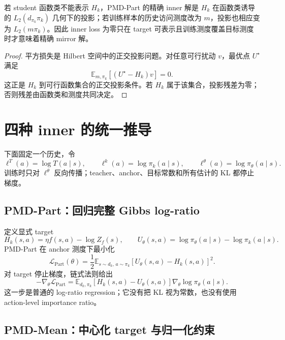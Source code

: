 \begin{proposition}[平方回归的投影含义]
\label{prop:ch2-regression-projection}
若 student 函数类不能表示 $H_k$，PMD-Part 的精确 inner 解是 $H_k$ 在函数类诱导的 $L_2(d_{\pi_k}\pi_k)$ 几何下的投影；若训练样本的历史访问测度改为 $m$，投影也相应变为 $L_2(m\pi_k)$。因此 inner loss 为零只在 target 可表示且训练测度覆盖目标测度时才意味着精确 mirror 解。
\end{proposition}

\begin{proof}
平方损失是 Hilbert 空间中的正交投影问题。对任意可行扰动 $v$，最优点 $U^\star$ 满足
\[
\mathbb E_{m,\pi_k}[(U^\star-H_k)v]=0.
\]
这正是 $H_k$ 到可行函数集合的正交投影条件。若 $H_k$ 属于该集合，投影残差为零；否则残差由函数类和测度共同决定。
\end{proof}

\section{四种 inner 的统一推导}
\label{sec:ch2-four-methods}

下面固定一个历史，令
\[
\ell^T(a)=\log T(a\mid s),\qquad
\ell^k(a)=\log\pi_k(a\mid s),\qquad
\ell^\theta(a)=\log\pi_\theta(a\mid s).
\]
训练时只对 $\ell^\theta$ 反向传播；teacher、anchor、目标常数和所有估计的 KL 都停止梯度。

\subsection{PMD-Part：回归完整 Gibbs log-ratio}
\label{sec:ch2-pmd-part}

定义显式 target
\[
H_k(s,a)=\eta f(s,a)-\log Z_f(s),
\qquad
U_\theta(s,a)=\log\pi_\theta(a\mid s)-\log\pi_k(a\mid s).
\]
PMD-Part 在 anchor 测度下最小化
\begin{equation}
\label{eq:ch2-part-loss}
\mathcal L_{\mathrm{Part}}(\theta)
=\frac12\mathbb E_{s\sim d_k,\,a\sim\pi_k}
\left[U_\theta(s,a)-H_k(s,a)\right]^2.
\end{equation}
对 target 停止梯度，链式法则给出
\begin{equation}
\label{eq:ch2-part-gradient}
-\nabla_\theta\mathcal L_{\mathrm{Part}}
=\mathbb E_{d_k,\pi_k}
\left[H_k(s,a)-U_\theta(s,a)\right]
\nabla_\theta\log\pi_\theta(a\mid s).
\end{equation}
这一步是普通的 log-ratio regression；它没有把 KL 视为常数，也没有使用 action-level importance ratio。

\subsection{PMD-Mean：中心化 target 与归一化约束}
\label{sec:ch2-pmd-mean}

